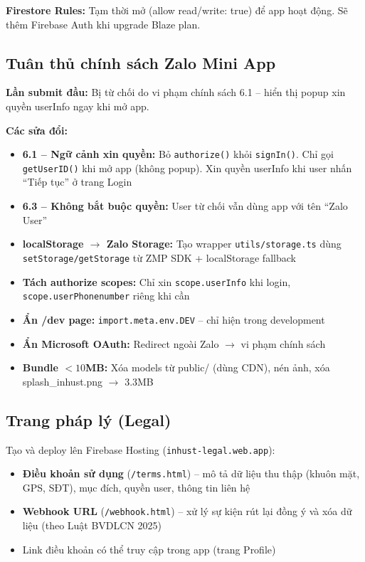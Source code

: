\documentclass{article}
\begin{document}
\textbf{Firestore Rules:} Tạm thời mở (allow read/write: true) để app hoạt động. Sẽ thêm Firebase Auth khi upgrade Blaze plan.

\subsection{Tuân thủ chính sách Zalo Mini App}

\textbf{Lần submit đầu:} Bị từ chối do vi phạm chính sách 6.1 -- hiển thị popup xin quyền userInfo ngay khi mở app.

\textbf{Các sửa đổi:}
\begin{itemize}[leftmargin=1.5em]
  \item \textbf{6.1 -- Ngữ cảnh xin quyền:} Bỏ \texttt{authorize()} khỏi \texttt{signIn()}. Chỉ gọi \texttt{getUserID()} khi mở app (không popup). Xin quyền userInfo khi user nhấn ``Tiếp tục'' ở trang Login
  \item \textbf{6.3 -- Không bắt buộc quyền:} User từ chối vẫn dùng app với tên ``Zalo User''
  \item \textbf{localStorage $\rightarrow$ Zalo Storage:} Tạo wrapper \texttt{utils/storage.ts} dùng \texttt{setStorage/getStorage} từ ZMP SDK + localStorage fallback
  \item \textbf{Tách authorize scopes:} Chỉ xin \texttt{scope.userInfo} khi login, \texttt{scope.userPhonenumber} riêng khi cần
  \item \textbf{Ẩn /dev page:} \texttt{import.meta.env.DEV} -- chỉ hiện trong development
  \item \textbf{Ẩn Microsoft OAuth:} Redirect ngoài Zalo $\rightarrow$ vi phạm chính sách
  \item \textbf{Bundle $< 10$MB:} Xóa models từ public/ (dùng CDN), nén ảnh, xóa splash\_inhust.png $\rightarrow$ 3.3MB
\end{itemize}

\subsection{Trang pháp lý (Legal)}

Tạo và deploy lên Firebase Hosting (\texttt{inhust-legal.web.app}):
\begin{itemize}[leftmargin=1.5em]
  \item \textbf{Điều khoản sử dụng} (\texttt{/terms.html}) -- mô tả dữ liệu thu thập (khuôn mặt, GPS, SĐT), mục đích, quyền user, thông tin liên hệ
  \item \textbf{Webhook URL} (\texttt{/webhook.html}) -- xử lý sự kiện rút lại đồng ý và xóa dữ liệu (theo Luật BVDLCN 2025)
  \item Link điều khoản có thể truy cập trong app (trang Profile)
\end{itemize}
\end{document}
